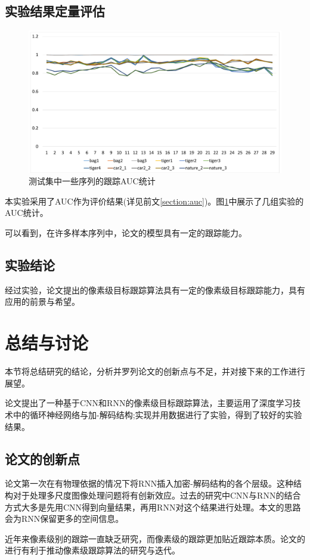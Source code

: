 \subsection{实验结果定量评估}
\par
\begin{figure}
    \centering
    \includegraphics[width = 1.\textwidth]{chap/img/res_auc.pdf}
    \caption{测试集中一些序列的跟踪AUC统计}
    \label{fig:res_auc}
\end{figure}
\par
本实验采用了AUC作为评价结果(详见前文\ref{section:auc})。图\ref{fig:res_auc}中展示了几组实验的AUC统计。
\par
可以看到，在许多样本序列中，论文的模型具有一定的跟踪能力。
\subsection{实验结论}
经过实验，论文提出的像素级目标跟踪算法具有一定的像素级目标跟踪能力，具有应用的前景与希望。

\section{总结与讨论}
本节将总结研究的结论，分析并罗列论文的创新点与不足，并对接下来的工作进行展望。
\par
论文提出了一种基于CNN和RNN的像素级目标跟踪算法，主要运用了深度学习技术中的循环神经网络与加-解码结构;实现并用数据进行了实验，得到了较好的实验结果。
\subsection{论文的创新点}
论文第一次在有物理依据的情况下将RNN插入加密-解码结构的各个层级。这种结构对于处理多尺度图像处理问题将有创新效应。过去的研究中CNN与RNN的结合方式大多是先用CNN得到向量结果，再用RNN对这个结果进行处理。本文的思路会为RNN保留更多的空间信息。
\par
近年来像素级别的跟踪一直缺乏研究，而像素级的跟踪更加贴近跟踪本质。论文的进行有利于推动像素级跟踪算法的研究与迭代。
